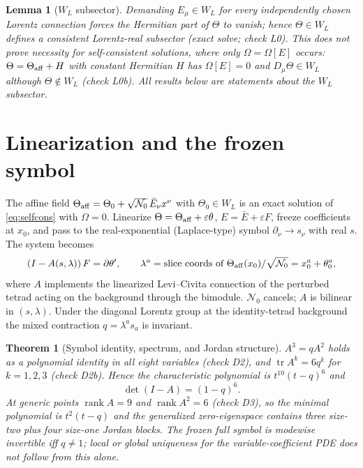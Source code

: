 \documentclass[11pt,a4paper]{article}
\newtheorem{theorem}{Theorem}
\newtheorem{lemma}{Lemma}
\begin{document}
\begin{lemma}[$W_L$ subsector]\label{lem:sector}
Demanding $E_\mu\in W_L$ for \emph{every} independently chosen Lorentz
connection forces the Hermitian part of $\Theta$ to vanish; hence
$\Theta\in W_L$ defines a consistent Lorentz-real subsector (exact
solve; check L0).  This does \emph{not} prove necessity for
self-consistent solutions, where only $\Omega=\Omega[E]$ occurs:
$\Theta=\Theta_{\rm aff}+H$ with constant Hermitian $H$ has
$\Omega[E]=0$ and $D_\mu\Theta\in W_L$ although $\Theta\notin W_L$
(check L0b).  All results below are statements about the $W_L$
subsector.
\end{lemma}

\section{Linearization and the frozen symbol}
The affine field $\Theta_{\rm aff}=\Theta_0+\sqrt{\mathcal N_0}\,\bar
E_\nu x^\nu$ with $\Theta_0\in W_L$ is an exact solution of
\eqref{eq:selfcons} with $\Omega=0$.  Linearize
$\Theta=\Theta_{\rm aff}+\varepsilon\theta$,
$E=\bar E+\varepsilon F$, freeze coefficients at $x_0$, and pass to the
real-exponential (Laplace-type) symbol $\partial_\nu\to s_\nu$ with
real $s$.  The system becomes
\begin{equation}
  (I-A(s,\lambda))\,F=\partial\theta',\qquad
  \lambda^a=\text{slice coords of }\Theta_{\rm aff}(x_0)/\sqrt{\mathcal N_0}
  =x_0^a+\theta_0^a,
\end{equation}
where $A$ implements the linearized Levi--Civita connection of the
perturbed tetrad acting on the background through the bimodule.
$\mathcal N_0$ cancels; $A$ is bilinear in $(s,\lambda)$.  Under the
diagonal Lorentz group at the identity-tetrad background the mixed
contraction $q=\lambda^a s_a$ is invariant.

\begin{theorem}[Symbol identity, spectrum, and Jordan structure]
\label{thm:symbol}
$A^3=qA^2$ holds as a polynomial identity in all eight variables
(check D2), and $\operatorname{tr}A^k=6q^k$ for $k=1,2,3$
(check D2b).  Hence the characteristic polynomial is
$t^{10}(t-q)^6$ and
\begin{equation}
  \det(I-A)=(1-q)^6.
\end{equation}
At generic points $\operatorname{rank}A=9$ and
$\operatorname{rank}A^2=6$ (check D3), so the minimal polynomial is
$t^2(t-q)$ and the generalized zero-eigenspace contains three size-two
plus four size-one Jordan blocks.  The frozen full symbol is modewise
invertible iff $q\neq1$; local or global uniqueness for the
variable-coefficient PDE does not follow from this alone.
\end{theorem}
\end{document}
